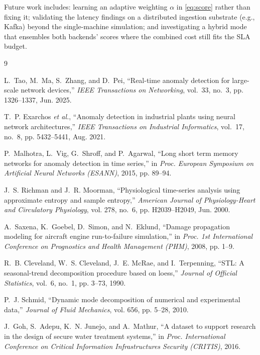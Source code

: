 Future work includes: learning an adaptive weighting $\alpha$ in
\eqref{eq:score} rather than fixing it; validating the latency findings on
a distributed ingestion substrate (e.g., Kafka) beyond the single-machine
simulation; and investigating a hybrid mode that ensembles both backends'
scores where the combined cost still fits the SLA budget.

\begin{thebibliography}{9}

L.~Tao, M.~Ma, S.~Zhang, and D.~Pei, ``Real-time anomaly detection for
large-scale network devices,'' \emph{IEEE Transactions on Networking},
vol.~33, no.~3, pp. 1326--1337, Jun. 2025.

T.~P. Exarchos \emph{et al.}, ``Anomaly detection in industrial plants
using neural network architectures,'' \emph{IEEE Transactions on
Industrial Informatics}, vol.~17, no.~8, pp. 5432--5441, Aug. 2021.

P.~Malhotra, L.~Vig, G.~Shroff, and P.~Agarwal, ``Long short term memory
networks for anomaly detection in time series,'' in \emph{Proc. European
Symposium on Artificial Neural Networks (ESANN)}, 2015, pp. 89--94.

J.~S. Richman and J.~R. Moorman, ``Physiological time-series analysis
using approximate entropy and sample entropy,'' \emph{American Journal of
Physiology-Heart and Circulatory Physiology}, vol. 278, no.~6, pp.
H2039--H2049, Jun. 2000.

A.~Saxena, K.~Goebel, D.~Simon, and N.~Eklund, ``Damage propagation
modeling for aircraft engine run-to-failure simulation,'' in \emph{Proc.
1st International Conference on Prognostics and Health Management (PHM)},
2008, pp. 1--9.

R.~B. Cleveland, W.~S. Cleveland, J.~E. McRae, and I.~Terpenning, ``STL: A
seasonal-trend decomposition procedure based on loess,'' \emph{Journal of
Official Statistics}, vol.~6, no.~1, pp. 3--73, 1990.

P.~J. Schmid, ``Dynamic mode decomposition of numerical and experimental
data,'' \emph{Journal of Fluid Mechanics}, vol. 656, pp. 5--28, 2010.

J.~Goh, S.~Adepu, K.~N. Junejo, and A.~Mathur, ``A dataset to support
research in the design of secure water treatment systems,'' in \emph{Proc.
International Conference on Critical Information Infrastructures Security
(CRITIS)}, 2016.


\end{thebibliography}
